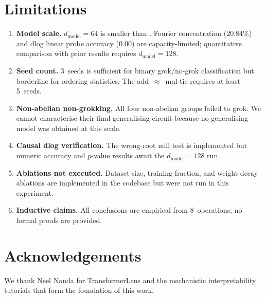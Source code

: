 \documentclass[11pt]{article}
\begin{document}
\section{Limitations}
\label{sec:limitations}

\begin{enumerate}
  \item \textbf{Model scale.} $d_{\text{model}}=64$ is smaller than
        \citet{nanda2023progress}. Fourier concentration (20.84\%) and
        dlog linear probe accuracy (0.00) are capacity-limited; quantitative
        comparison with prior results requires $d_{\text{model}}=128$.

  \item \textbf{Seed count.} 3~seeds is sufficient for binary
        grok/no-grok classification but borderline for ordering statistics.
        The add~$\approx$~mul tie requires at least 5~seeds.

  \item \textbf{Non-abelian non-grokking.} All four non-abelian groups
        failed to grok. We cannot characterise their final generalising
        circuit because no generalising model was obtained at this scale.

  \item \textbf{Causal dlog verification.} The wrong-root null test is
        implemented but numeric accuracy and $p$-value results await the
        $d_{\text{model}}=128$ run.

  \item \textbf{Ablations not executed.} Dataset-size, training-fraction,
        and weight-decay ablations are implemented in the codebase but were
        not run in this experiment.

  \item \textbf{Inductive claims.} All conclusions are empirical from
        8~operations; no formal proofs are provided.
\end{enumerate}

\section*{Acknowledgements}

We thank Neel Nanda for TransformerLens and the mechanistic interpretability
tutorials that form the foundation of this work.


\end{document}
